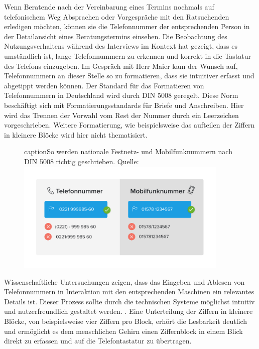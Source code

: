 \documentclass[12pt]{article}
\newcommand{\ipName}{Herr Maier }
\begin{document}
Wenn Beratende nach der Vereinbarung eines Termins nochmals auf telefonischem
Weg Absprachen oder Vorgespräche mit den Ratsuchenden erledigen möchten, können
sie die Telefonnummer der entsprechenden Person in der Detailansicht eines
Beratungstermins einsehen. Die Beobachtung des Nutzungsverhaltens während des
Interviews im Kontext hat gezeigt, dass es umständlich ist, lange
Telefonnummern zu erkennen und korrekt in die Tastatur des Telefons einzugeben.
Im Gespräch mit \ipName kam der Wunsch auf, Telefonnummern an dieser Stelle so
zu formatieren, dass sie intuitiver erfasst und abgetippt werden können. Der
Standard für das Formatieren von Telefonnummern in Deutschland wird durch DIN
5008 geregelt. Diese Norm beschäftigt sich mit Formatierungsstandards für
Briefe und Anschreiben. Hier wird das Trennen der Vorwahl vom Rest der Nummer
durch ein Leerzeichen vorgeschrieben. Weitere Formatierung, wie beispielsweise
das aufteilen der Ziffern in kleinere Blöcke wird hier nicht thematisiert.
\cite{din5008}

\begin{figure}[h]
    caption{So werden nationale Festnetz- und Mobilfunknummern nach DIN 5008 richtig geschrieben. Quelle: \cite{phoneFormatBlog}}
    \centering
    \includegraphics[width=0.9\textwidth]{grafik-telefonnummer-national.png}
\end{figure}

Wissenschaftliche Untersuchungen zeigen, dass das Eingeben und Ablesen von
Telefonnummern in Interaktion mit den entsprechenden Maschinen ein relevantes
Details ist. Dieser Prozess sollte durch die technischen Systeme möglichst
intuitiv und nutzerfreundlich gestaltet werden. \cite{humCompPhoneNumbers}.
Eine Unterteilung der Ziffern in kleinere Blöcke, von beispielsweise vier
Ziffern pro Block, erhört die Lesbarkeit deutlich und ermöglicht es dem
menschlichen Gehirn einen Ziffernblock in einem Blick direkt zu erfassen und
auf die Telefontastatur zu übertragen. \cite{phoneFormatBlog}
\cite{numberRecognition} \cite{numberRepres}
\end{document}
